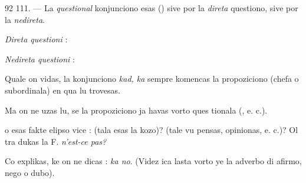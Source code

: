 \begin{VUpage}[96]{92}
\VUblanc{8.60pt}%
111. --- La \textit{questional} konjunciono esas  () sive\nl
por la \textit{direta} questiono, sive por la \textit{nedireta}.

\textit{Direta questioni} : \nl
{}

\textit{Nedireta questioni} : \cc
{}

Quale on vidas, la konjunciono \textit{kad, ka} sempre komencas\nl
la propoziciono (chefa o subordinala) en qua lu trovesas.

Ma on ne uzas lu, se la propoziciono ja havas vorto ques\cc
tionala (, e. c.).

 o  esas fakte elipso vice :  (tala esas\nl
la kozo)?  (tale vu pensas, opinionas, e. c.)? Ol tra\cc
dukas la F. \textit{n'est-ce pas?}

Co explikas, ke on ne dicas : \textit{ka no}. (Videz ica lasta vorto\nl
ye la adverbo di afirmo, nego o dubo).
\end{VUpage}

